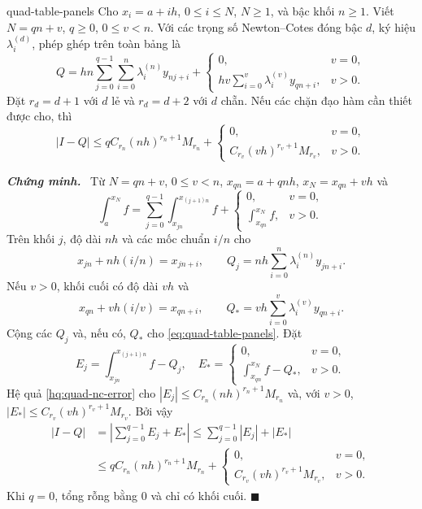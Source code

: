 \documentclass[12pt,a4paper,oneside]{book}
\numberwithin{algorithm}{chapter}
\theoremstyle{definition}
\newenvironment{chungminh}{\par\medskip\noindent\textbf{\textit{\color{mainblue}Chứng minh.}}\ }{\hfill$\blacksquare$\par\medskip}
\begin{document}
\begin{menhde}{}{quad-table-panels}
Cho $x_i=a+ih$, $0\leq i\leq N$, $N\geq1$, và bậc khối $n\geq1$. Viết $N=qn+v$, $q\geq0$, $0\leq v<n$. Với các trọng số Newton--Cotes đóng bậc $d$, ký hiệu $\lambda_i^{(d)}$, phép ghép trên toàn bảng là
\begin{equation}\label{eq:quad-table-panels}
 Q=h n\sum_{j=0}^{q-1}\sum_{i=0}^n\lambda_i^{(n)}y_{nj+i}
 +\begin{cases}0,&v=0,\\hv\sum_{i=0}^v\lambda_i^{(v)}y_{qn+i},&v>0.\end{cases}
\end{equation}
Đặt $r_d=d+1$ với $d$ lẻ và $r_d=d+2$ với $d$ chẵn. Nếu các chặn đạo hàm cần thiết được cho, thì
\[
 |I-Q|\leq q C_{r_n}(nh)^{r_n+1}M_{r_n}
 +\begin{cases}0,&v=0,\\C_{r_v}(vh)^{r_v+1}M_{r_v},&v>0.\end{cases}
\]
\end{menhde}
\begin{chungminh}
Từ $N=qn+v$, $0\leq v<n$, $x_{qn}=a+qnh$, $x_N=x_{qn}+vh$ và
\[
 \int_a^{x_N}f
 =\sum_{j=0}^{q-1}\int_{x_{jn}}^{x_{(j+1)n}}f
 +\begin{cases}0,&v=0,\\\displaystyle\int_{x_{qn}}^{x_N}f,&v>0.\end{cases}
\]
Trên khối $j$, độ dài $nh$ và các mốc chuẩn $i/n$ cho
\[
 x_{jn}+nh(i/n)=x_{jn+i},\qquad
 Q_j=nh\sum_{i=0}^n\lambda_i^{(n)}y_{jn+i}.
\]
Nếu $v>0$, khối cuối có độ dài $vh$ và
\[
 x_{qn}+vh(i/v)=x_{qn+i},\qquad
 Q_*=vh\sum_{i=0}^v\lambda_i^{(v)}y_{qn+i}.
\]
Cộng các $Q_j$ và, nếu có, $Q_*$ cho \eqref{eq:quad-table-panels}. Đặt
\[
 E_j=\int_{x_{jn}}^{x_{(j+1)n}}f-Q_j,
 \quad E_*=\begin{cases}0,&v=0,\\\displaystyle\int_{x_{qn}}^{x_N}f-Q_*,&v>0.\end{cases}
\]
Hệ quả \ref{hq:quad-nc-error} cho $|E_j|\leq C_{r_n}(nh)^{r_n+1}M_{r_n}$ và, với $v>0$, $|E_*|\leq C_{r_v}(vh)^{r_v+1}M_{r_v}$. Bởi vậy
\begin{align*}
 |I-Q|&=\left|\sum_{j=0}^{q-1}E_j+E_*\right|
 \leq\sum_{j=0}^{q-1}|E_j|+|E_*|\\
 &\leq qC_{r_n}(nh)^{r_n+1}M_{r_n}
 +\begin{cases}0,&v=0,\\C_{r_v}(vh)^{r_v+1}M_{r_v},&v>0.\end{cases}
\end{align*}
Khi $q=0$, tổng rỗng bằng $0$ và chỉ có khối cuối.
\end{chungminh}
\end{document}
